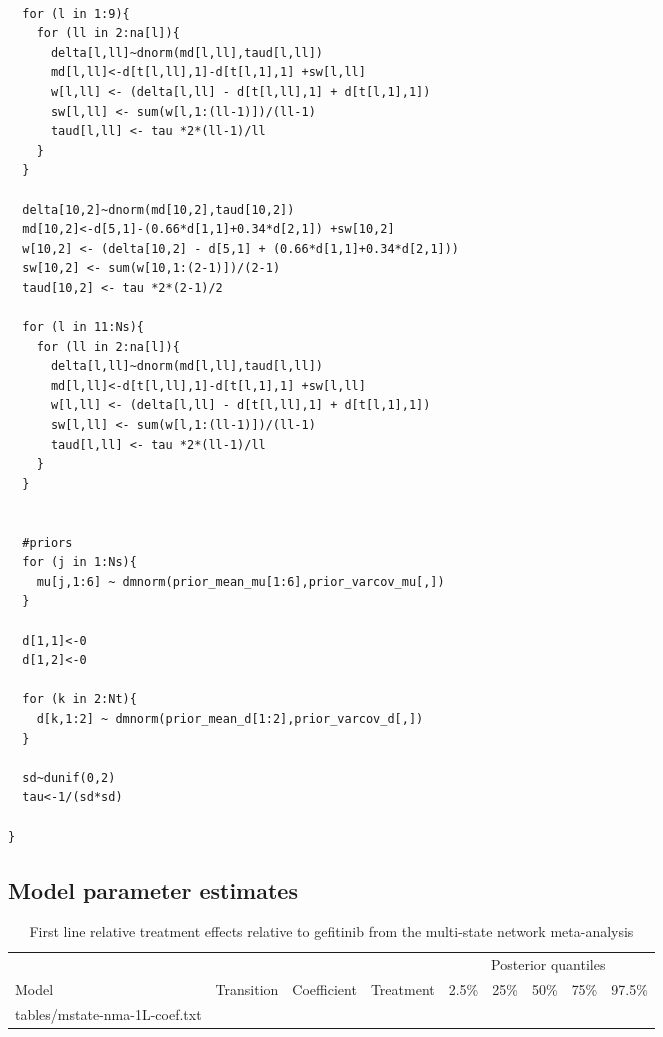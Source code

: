 \documentclass[11pt,final,fleqn]{article}\usepackage[]{graphicx}\usepackage[]{color}
\makeatletter
\theoremstyle{plain}
\newcommand*\ExpandableInput[1]{\@@input#1 }
\makeatother
\begin{document}
\begin{appendices}
\begin{verbatim}
  
  for (l in 1:9){
    for (ll in 2:na[l]){
      delta[l,ll]~dnorm(md[l,ll],taud[l,ll])
      md[l,ll]<-d[t[l,ll],1]-d[t[l,1],1] +sw[l,ll]
      w[l,ll] <- (delta[l,ll] - d[t[l,ll],1] + d[t[l,1],1])
      sw[l,ll] <- sum(w[l,1:(ll-1)])/(ll-1) 
      taud[l,ll] <- tau *2*(ll-1)/ll 
    }
  }
  
  delta[10,2]~dnorm(md[10,2],taud[10,2])
  md[10,2]<-d[5,1]-(0.66*d[1,1]+0.34*d[2,1]) +sw[10,2]
  w[10,2] <- (delta[10,2] - d[5,1] + (0.66*d[1,1]+0.34*d[2,1]))
  sw[10,2] <- sum(w[10,1:(2-1)])/(2-1) 
  taud[10,2] <- tau *2*(2-1)/2 
  
  for (l in 11:Ns){
    for (ll in 2:na[l]){
      delta[l,ll]~dnorm(md[l,ll],taud[l,ll])
      md[l,ll]<-d[t[l,ll],1]-d[t[l,1],1] +sw[l,ll]
      w[l,ll] <- (delta[l,ll] - d[t[l,ll],1] + d[t[l,1],1])
      sw[l,ll] <- sum(w[l,1:(ll-1)])/(ll-1) 
      taud[l,ll] <- tau *2*(ll-1)/ll 
    }
  }
  
  
  #priors
  for (j in 1:Ns){
    mu[j,1:6] ~ dmnorm(prior_mean_mu[1:6],prior_varcov_mu[,]) 
  }
  
  d[1,1]<-0
  d[1,2]<-0

  for (k in 2:Nt){
    d[k,1:2] ~ dmnorm(prior_mean_d[1:2],prior_varcov_d[,]) 
  }
  
  sd~dunif(0,2)
  tau<-1/(sd*sd)
  
}

\end{verbatim}


\subsection{Model parameter estimates}

\begin{table}[!ht]
\begin{center}
\begin{threeparttable}
\footnotesize
\caption{First line relative treatment effects relative to gefitinib from the multi-state network meta-analysis}  \label{tbl:mstate-nma-1L-coef}
\begin{tabularx}{\textwidth}{@{\extracolsep{\fill}}llllrrrrr}
\hline
\multicolumn{4}{c}{} & \multicolumn{5}{c}{Posterior quantiles} \\
\cmidrule{5-9}
\multicolumn{1}{l}{Model} & \multicolumn{1}{l}{Transition} & \multicolumn{1}{l}{Coefficient} & \multicolumn{1}{l}{Treatment} 
& \multicolumn{1}{r}{2.5\%} & \multicolumn{1}{r}{25\%} & \multicolumn{1}{r}{50\%} & \multicolumn{1}{r}{75\%} & \multicolumn{1}{r}{97.5\%} \\
\hline
\ExpandableInput{tables/mstate-nma-1L-coef.txt}
\hline
\end{tabularx}
\scriptsize
\end{threeparttable}
\end{center}
\end{table}


\end{appendices}
\end{document}
